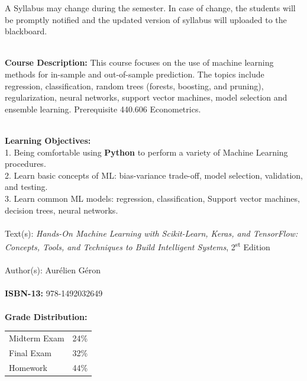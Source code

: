 \documentclass[11pt]{article}
\begin{document}
\vspace{5mm}
\begin{center} A Syllabus may change during the semester. In case of change, the students will be promptly notified and the updated version of syllabus will uploaded to the blackboard.   \\
\end{center}



\textbf{\large \\ Course Description:} This course focuses on the use of machine learning methods for in-sample and out-of-sample prediction. The topics include regression, classification, random trees (forests, boosting, and pruning), regularization, neural networks, support vector machines, model selection and ensemble learning. Prerequisite 440.606 Econometrics.

\textbf{\large \\ Learning Objectives:} \\
1. Being comfortable using \textbf{Python} to perform a variety of Machine Learning procedures. \\
2. Learn basic concepts of ML: bias-variance trade-off, model selection, validation, and testing.  \\
3. Learn common ML models: regression, classification, Support vector machines, decision trees, neural networks.\\
\\
 {\large Text(s):} \emph{Hands-On Machine Learning with Scikit-Learn, Keras, and TensorFlow: Concepts, Tools, and Techniques to Build Intelligent Systems}, 2\textsuperscript{st} Edition \\\\
 {Author(s):} Aurélien Géron \\\\
  \textbf {ISBN-13:}  978-1492032649 \\\\

\textbf {\large Grade Distribution:} \\
\hspace*{40mm}
\begin{tabular}{ l l }
Midterm Exam & 24\% \\
Final Exam & 32\% \\
Homework & 44\% \\
\end{tabular} \\\\
\end{document}
